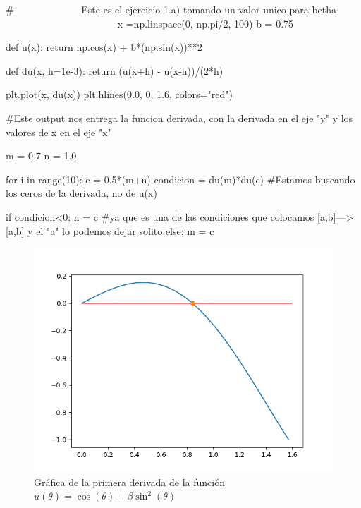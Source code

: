 \documentclass[../portafolio.tex]{subfiles}
\begin{document}
	\begin{listing}
		\begin{pythoncode}
# ~~~~~~~~~~~~~Este es el ejercicio 1.a) tomando un valor unico para betha ~~~~~~~~~~~~~~~~~~~~~~
x =np.linspace(0, np.pi/2, 100)  
b = 0.75

def u(x):
    return np.cos(x) + b*(np.sin(x))**2


def du(x, h=1e-3):
    return (u(x+h) - u(x-h))/(2*h)


plt.plot(x, du(x))
plt.hlines(0.0, 0, 1.6, colors="red")

#Este output nos entrega la funcion derivada, con la derivada en el eje "y" y los valores de x en el eje "x"


m = 0.7
n = 1.0

for i in range(10):
    c = 0.5*(m+n)
    condicion = du(m)*du(c) #Estamos buscando los ceros de la derivada, no de u(x)

    if condicion<0: 
        n = c #ya que es una de las condiciones que colocamos [a,b]---> [a,b] y el "a" lo podemos dejar solito
    else:
        m = c
		\end{pythoncode}
		\caption{Codigo utilizado para graficar la figura \ref{img:graphceros}}
		\label{code:ceros}
	\end{listing}

	\begin{figure}
		\includegraphics[scale=0.5]{graph-ceros.png}
		\caption{Gr\'afica de la primera derivada de la funci\'on $u(\theta) = \cos (\theta) + \beta \sin^2 (\theta)$}
		\label{img:graphceros}
	\end{figure}
\end{document}
